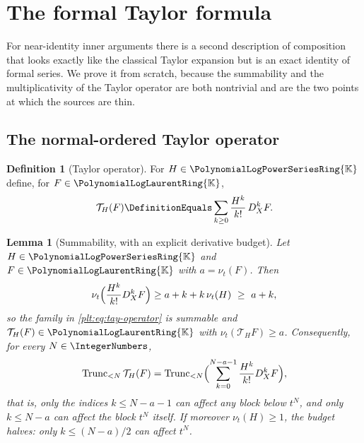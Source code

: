 \documentclass[11pt,oneside]{article}
\theoremstyle{plain}
\newtheorem{lemma}[theorem]{Lemma}
\theoremstyle{definition}
\newtheorem{definition}[theorem]{Definition}
\theoremstyle{remark}
\newcommand{\K}{\mathbb{K}}
\newcommand{\PLpow}{\PolynomialLogPowerSeriesRing{\K}}   %
\newcommand{\PLlau}{\PolynomialLogLaurentRing{\K}}       %
\newcommand{\ordt}{\nu_{t}}                              %
\newcommand{\Trunc}[2]{\operatorname{Trunc}_{<#2}#1}     %
\newcommand{\DX}{D_{X}}                                  %
\begin{document}
\section{The formal Taylor formula}
\label{plt:sec:taylor}

For near-identity inner arguments there is a second description of composition
that looks exactly like the classical Taylor expansion but is an exact
identity of formal series.  We prove it from scratch, because the summability
and the multiplicativity of the Taylor operator are both nontrivial and are
the two points at which the sources are thin.

\subsection{The normal-ordered Taylor operator}
\label{plt:sec:tay-operator}

\begin{definition}[Taylor operator]\label{plt:def:tay-operator}
For \(H\in\PLpow\) define, for \(F\in\PLlau\),
\begin{equation}\label{plt:eq:tay-operator}
 \mathcal T_{H}(F)\DefinitionEquals
 \sum_{k\ge0}\frac{H^{k}}{k!}\,\DX^{k}F .
\end{equation}
\end{definition}

\begin{lemma}[Summability, with an explicit derivative budget]
\label{plt:lem:tay-summability}
Let \(H\in\PLpow\) and \(F\in\PLlau\) with \(a=\ordt(F)\).  Then
\begin{equation}\label{plt:eq:tay-valuation-bound}
 \ordt\Bigl(\frac{H^{k}}{k!}\DX^{k}F\Bigr)
 \ge a+k+k\,\ordt(H)\ \ge\ a+k,
\end{equation}
so the family in \eqref{plt:eq:tay-operator} is summable and
\(\mathcal T_{H}(F)\in\PLlau\) with
\(\ordt(\mathcal T_{H}F)\ge a\).  Consequently, for every
\(N\in\IntegerNumbers\),
\begin{equation}\label{plt:eq:tay-truncation}
 \Trunc{\mathcal T_{H}(F)}{N}
 =\Trunc{\Bigl(\sum_{k=0}^{N-a-1}\frac{H^{k}}{k!}\DX^{k}F\Bigr)}{N},
\end{equation}
that is, only the indices \(k\le N-a-1\) can affect any block below \(t^{N}\),
and only \(k\le N-a\) can affect the block \(t^{N}\) itself.  If moreover
\(\ordt(H)\ge1\), the budget halves: only \(k\le(N-a)/2\) can affect
\(t^{N}\).
\end{lemma}
\end{document}
